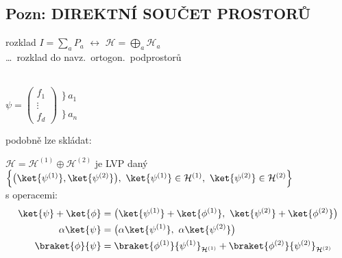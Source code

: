 \documentclass[11pt,a4paper]{article}
\begin{document}
\subsection*{Pozn: DIREKTNÍ SOUČET PROSTORŮ}
\begin{minipage}{0.72\textwidth}
rozklad \quad $I = \sum_a P_a$ \quad $\longleftrightarrow$ \quad $\mathcal{H} = \bigoplus_a\mathcal{H}_a$ \\
\hspace*{4cm} \dots\ rozklad do navz.\ ortogon.\ podprostorů
\end{minipage}
\begin{minipage}{0.26\textwidth}
 \\
$\psi = \left(\begin{array}{c} f_1 \\ \hline \vdots \\ \hline f_d \end{array}\right)
 \begin{array}{l} \}\,a_1 \\ \\ \}\,a_n \end{array}$
\end{minipage}

podobně lze skládat:

\begin{definice}
$\mathcal{H} = \mathcal{H}^{(1)}\oplus\mathcal{H}^{(2)}$ \quad je LVP daný
$\Big\{\big(\ket{\psi^{(1)}},\ket{\psi^{(2)}}\big),\ \ket{\psi^{(1)}}\in\mathcal{H}^{(1)},\ \ket{\psi^{(2)}}\in\mathcal{H}^{(2)}\Big\}$ \\
\quad s operacemi:
\begin{align*}
  \ket{\psi} + \ket{\phi} &= \big(\ket{\psi^{(1)}} + \ket{\phi^{(1)}},\ \ket{\psi^{(2)}} + \ket{\phi^{(2)}}\big) \\
  \alpha\ket{\psi} &= \big(\alpha\ket{\psi^{(1)}},\ \alpha\ket{\psi^{(2)}}\big) \\
  \braket{\phi}{\psi} &= \braket{\phi^{(1)}}{\psi^{(1)}}_{\mathcal{H}^{(1)}} + \braket{\phi^{(2)}}{\psi^{(2)}}_{\mathcal{H}^{(2)}}
\end{align*}
\end{definice}
\end{document}
